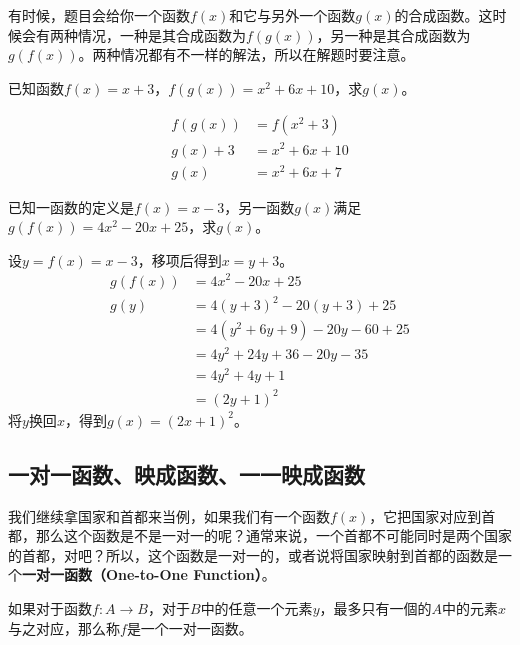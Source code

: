 \documentclass[UTF8]{ctexart}
\begin{document}
\newpage
有时候，题目会给你一个函数$f(x)$和它与另外一个函数$g(x)$的合成函数。这时候会有两种情况，一种是其合成函数为$f(g(x))$，另一种是其合成函数为$g(f(x))$。两种情况都有不一样的解法，所以在解题时要注意。

\begin{question}
    已知函数$f(x) = x+3$，$f(g(x)) = x^2 + 6x + 10$，求$g(x)$。
\end{question}

\begin{solution}
    \vspace{-1em}
    \begin{align*}
        f(g(x)) &= f(x^2 + 3)\\
    g(x) + 3 &= x^2 + 6x + 10\\
    g(x) &= x^2 + 6x + 7
    \end{align*}
\end{solution}

\begin{question}
    已知一函数的定义是$f(x) = x - 3$，另一函数$g(x)$满足$g(f(x)) = 4x^2 - 20x + 25$，求$g(x)$。
\end{question}

\begin{solution}
    设$y = f(x) = x - 3$，移项后得到$x = y + 3$。
    \begin{align*}
        g(f(x)) &= 4x^2 - 20x + 25\\
        g(y) &= 4(y + 3)^2 - 20(y + 3) + 25\\
        &= 4(y^2 + 6y + 9) - 20y - 60 + 25\\
        &= 4y^2 + 24y + 36 - 20y - 35\\
        &= 4y^2 + 4y + 1\\
        &= (2y + 1)^2
    \end{align*}
    将$y$换回$x$，得到$g(x) = (2x + 1)^2$。
\end{solution}

\newpage

\subsection{一对一函数、映成函数、一一映成函数}

我们继续拿国家和首都来当例，如果我们有一个函数$f(x)$，它把国家对应到首都，那么这个函数是不是一对一的呢？通常来说，一个首都不可能同时是两个国家的首都，对吧？所以，这个函数是一对一的，或者说将国家映射到首都的函数是一个\textbf{一对一函数（One-to-One Function）}。

\begin{info}[一对一函数的定义]
    如果对于函数$f: A \to B$，对于$B$中的任意一个元素$y$，最多只有一個的$A$中的元素$x$与之对应，那么称$f$是一个一对一函数。
\end{info}
\end{document}
